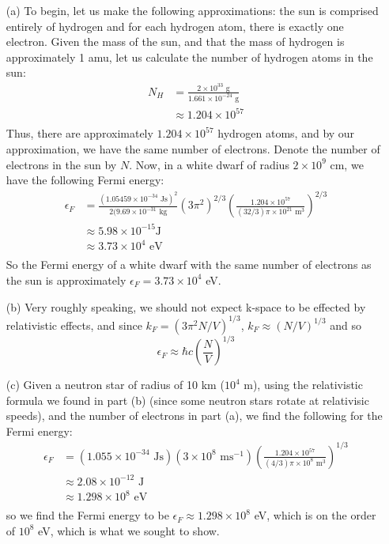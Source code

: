 \documentclass{article}
\begin{document}
\begin{itemize}
    \item[(a)] To begin, let us make the following approximations: the sun is comprised entirely of hydrogen and for each hydrogen atom, there is exactly one electron. Given the mass of the sun, and that the mass of hydrogen is approximately 1 amu, let us calculate the number of hydrogen atoms in the sun:
    \begin{align*}
        N_H &= \frac{2\times 10^{33} \text{ g}}{1.661 \times 10^{-24} \text{ g}} \\
        &\approx 1.204\times 10^{57} \\
    \end{align*}
    Thus, there are approximately $1.204 \times 10^{57}$ hydrogen atoms, and by our approximation, we have the same number of electrons. Denote the number of electrons in the sun by $N$. Now, in a white dwarf of radius $2\times 10^9 \text{ cm}$, we have the following Fermi energy:
    \begin{align*}
        \epsilon_F &= \frac{(1.05459 \times 10^{-34} \text{ Js})^2}{2(9.69\times 10^{-31} \text{ kg}}(3\pi^2)^{2/3}\left(\frac{1.204\times 10^{57}}{(32/3)\pi\times 10^{21}\text{ m}^3}\right)^{2/3} \\
        &\approx 5.98\times 10^{-15} \text{J} \\
        &\approx 3.73 \times 10^4 \text{ eV} \\
    \end{align*}
    So the Fermi energy of a white dwarf with the same number of electrons as the sun is approximately $\epsilon_F = 3.73 \times 10^4$ eV.
    
    
    \item[(b)] Very roughly speaking, we should not expect k-space to be effected by relativistic effects, and since $k_F = (3\pi^2N/V)^{1/3}$, $k_F \approx (N/V)^{1/3}$ and so 
    \[\epsilon_F \approx \hbar c \left(\frac{N}{V}\right)^{1/3}\]
    
    
    \item[(c)] Given a neutron star of radius of 10 km ($10^4$ m), using the relativistic formula we found in part (b) (since some neutron stars rotate at relativisic speeds), and the number of electrons in part (a), we find the following for the Fermi energy:
    \begin{align*}
        \epsilon_F &= (1.055\times 10^{-34} \text{ Js})(3\times 10^8 \text{ ms}^{-1})\left(\frac{1.204\times 10^{57}}{(4/3)\pi\times 10^8 \text{ m}^3}\right)^{1/3}\\
        &\approx 2.08 \times 10^{-12} \text{ J} \\
        &\approx 1.298\times 10^8 \text{ eV} \\
    \end{align*}
    so we find the Fermi energy to be $\epsilon_F \approx 1.298 \times 10^8$ eV, which is on the order of $10^8$ eV, which is what we sought to show.
    
    
\end{itemize}
\end{document}
